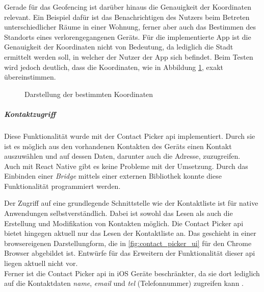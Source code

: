 Gerade für das Geofencing ist darüber hinaus die Genauigkeit der Koordinaten relevant.
Ein Beispiel dafür ist das Benachrichtigen des Nutzers beim Betreten unterschiedlicher Räume in einer Wohnung, ferner aber auch das Bestimmen des Standorts eines verlorengegangenen Geräts.
Für die implementierte App ist die Genauigkeit der Koordinaten nicht von Bedeutung, da lediglich die Stadt ermittelt werden soll, in welcher der Nutzer der App sich befindet.
Beim Testen wird jedoch deutlich, dass die Koordinaten, wie in Abbildung \ref{fig:comparison_geoloc}, exakt übereinstimmen.

\begin{figure}[h]
\caption{Darstellung der bestimmten Koordinaten}
\label{fig:comparison_geoloc}
\end{figure}

\subparagraph{Kontaktzugriff\\}
Diese Funktionalität wurde mit der Contact Picker \ac{api} implementiert.
Durch sie ist es möglich aus den vorhandenen Kontakten des Geräts einen Kontakt auszuwählen und auf dessen Daten, darunter auch die Adresse, zuzugreifen.\\
Auch mit React Native gibt es keine Probleme mit der Umsetzung.
Durch das Einbinden einer \textit{Bridge} mittels einer externen Bibliothek konnte diese Funktionalität programmiert werden.

Der Zugriff auf eine grundlegende Schnittstelle wie der Kontaktliste ist für native Anwendungen selbstverständlich.
Dabei ist sowohl das Lesen als auch die Erstellung und Modifikation von Kontakten möglich.
Die Contact Picker \ac{api} bietet hingegen aktuell nur das Lesen der Kontaktliste an.
Das geschieht in einer browsereigenen Darstellungform, die in \ref{fig:contact_picker_ui} für den Chrome Browser abgebildet ist.
Entwürfe für das Erweitern der Funktionalität dieser \ac{api} liegen aktuell nicht vor.\\
Ferner ist die Contact Picker \ac{api} in iOS Geräte beschränkter, da sie dort lediglich auf die Kontaktdaten \textit{name}, \textit{email} und \textit{tel} (Telefonnummer) zugreifen kann \cite{Firtman.2021}.

